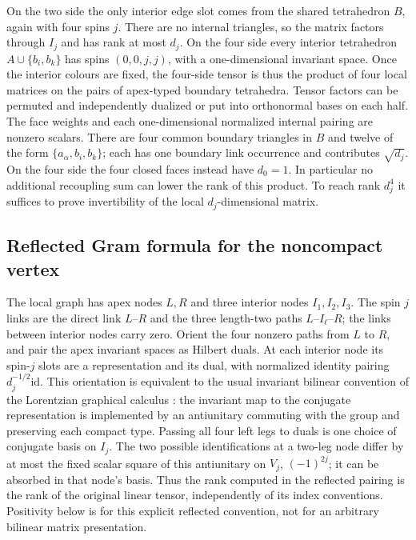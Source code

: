 \documentclass[11pt]{article}
\theoremstyle{remark}
\newcommand{\id}{\mathrm{id}}
\begin{document}
On the two side the only interior edge slot comes from the shared tetrahedron \(B\), again with four spins \(j\). There are no internal triangles, so the matrix factors through \(I_j\) and has rank at most \(d_j\). On the four side every interior tetrahedron \(A\cup\{b_i,b_k\}\) has spins \((0,0,j,j)\), with a one-dimensional invariant space. Once the interior colours are fixed, the four-side tensor is thus the product of four local matrices on the pairs of apex-typed boundary tetrahedra. Tensor factors can be permuted and independently dualized or put into orthonormal bases on each half. The face weights and each one-dimensional normalized internal pairing are nonzero scalars. There are four common boundary triangles in \(B\) and twelve of the form \(\{a_\alpha,b_i,b_k\}\); each has one boundary link occurrence and contributes \(\sqrt{d_j}\). On the four side the four closed faces instead have \(d_0=1\). In particular no additional recoupling sum can lower the rank of this product. To reach rank \(d_j^4\) it suffices to prove invertibility of the local \(d_j\)-dimensional matrix.

\subsection{Reflected Gram formula for the noncompact vertex}

The local graph has apex nodes \(L,R\) and three interior nodes \(I_1,I_2,I_3\). The spin \(j\) links are the direct link \(L\)--\(R\) and the three length-two paths \(L\)--\(I_\ell\)--\(R\); the links between interior nodes carry zero. Orient the four nonzero paths from \(L\) to \(R\), and pair the apex invariant spaces as Hilbert duals. At each interior node its spin-\(j\) slots are a representation and its dual, with normalized identity pairing \(d_j^{-1/2}\id\). This orientation is equivalent to the usual invariant bilinear convention of the Lorentzian graphical calculus \cite[Sec.~2]{Barrett}: the invariant map to the conjugate representation is implemented by an antiunitary commuting with the group and preserving each compact type. Passing all four left legs to duals is one choice of conjugate basis on \(I_j\). The two possible identifications at a two-leg node differ by at most the fixed scalar square of this antiunitary on \(V_j\), \((-1)^{2j}\); it can be absorbed in that node's basis. Thus the rank computed in the reflected pairing is the rank of the original linear tensor, independently of its index conventions. Positivity below is for this explicit reflected convention, not for an arbitrary bilinear matrix presentation.
\end{document}
